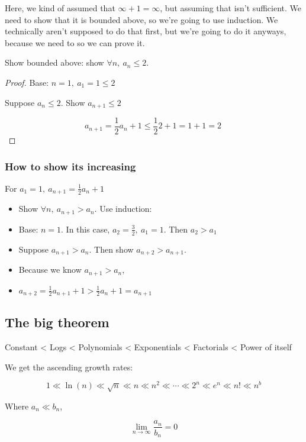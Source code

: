\documentclass[12pt]{article}
\theoremstyle{plain}
\theoremstyle{remark}
\theoremstyle{definition}
\begin{document}
Here, we kind of assumed that \(\infty + 1 = \infty\), but assuming that
isn't sufficient. We need to show that it is bounded above, so we're
going to use induction. We technically aren't supposed to do that first,
but we're going to do it anyways, because we need to so we can prove it.

Show bounded above: show \(\forall n,\ a_{n} \leq 2\).

\begin{proof} Base: \(n = 1,\ a_{1} = 1 \leq 2\)

Suppose \(a_{n} \leq 2\). Show \(a_{n + 1} \leq 2\)

\[a_{n + 1} = \frac{1}{2}a_{n} + 1 \leq \frac{1}{2}2 + 1 = 1 + 1 = 2\ \]
\end{proof}


\subsubsection{How to show its
increasing}

For \(a_{1} = 1,\ a_{n + 1} = \frac{1}{2}a_{n} + 1\)

\begin{itemize}
\item
  Show \(\forall n,\ a_{n + 1} > a_{n}\). Use induction:
\item
  Base: \(n = 1\). In this case, \(a_{2} = \frac{3}{2},\ a_{1} = 1\).
  Then \(a_{2} > a_{1}\)
\item
  Suppose \(a_{n + 1} > a_{n}\). Then show \(a_{n + 2} > a_{n + 1}\).
\item
  Because we know \(a_{n + 1} > a_{n}\),
\item
  \(a_{n + 2} = \frac{1}{2}a_{n + 1} + 1 > \frac{1}{2}a_{n} + 1 = a_{n + 1}\)
\end{itemize}


\subsection{The big theorem}

Constant \textless{} Logs \textless{} Polynomials \textless{}
Exponentials \textless{} Factorials \textless{} Power of itself

We get the ascending growth rates:

\[1 \ll \ln(n) \ll \sqrt{n} \ll n \ll n^{2} \ll \cdots \ll 2^{n} \ll e^{n} \ll n! \ll n^{b}\]

Where \(a_{n} \ll b_{n}\),

\[\lim_{n \rightarrow \infty}\frac{a_{n}}{b_{n}} = 0\]
\end{document}

